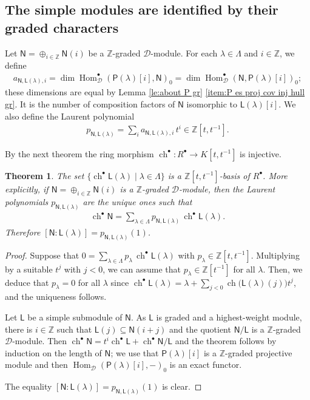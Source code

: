 \documentclass[reqno]{amsart}
\renewcommand{\_}[1]{_{\left( #1 \right)}}
\renewcommand{\^}[1]{^{\left( #1 \right)}}
\newcommand\fL{\mathsf{L}}
\newcommand\fN{\mathsf{N}}
\newcommand\fP{\mathsf{P}}
\newcommand{\Z}{{\mathbb Z}}
\newcommand{\D}{\mathcal{D}}
\newcommand{\ch}{\operatorname{ch}}
\newcommand{\chgr}{\operatorname{ch}^{\bullet}}
\newcommand\Hom{\operatorname{Hom}}
\theoremstyle{plain}
\newtheorem{theorem}[lema]{Theorem}
\theoremstyle{definition}
\theoremstyle{remark}
\begin{document}
\subsection{The simple modules are identified by their graded characters}

Let $\fN=\oplus_{i\in\Z}\fN(i)$ be a $\Z$-graded $\D$-module. For each $\lambda\in\Lambda$ and $i\in\Z$, we define
\begin{align}\label{eq:definition of a fN fLlambda i}
a_{\fN,\fL(\lambda),i}=\dim\Hom^\bullet_{\D}(\fP(\lambda)[i],\fN)_0=\dim\Hom^\bullet_{\D}(\fN,\fP(\lambda)[i])_0;
\end{align}
these dimensions are equal by Lemma \ref{le:about P gr} \ref{item:P es proj cov inj hull gr}. It is the number of composition factors of $\fN$ isomorphic to $\fL(\lambda)[i]$. We also define the Laurent polynomial 
\begin{align}\label{eq:def of p fN fLlambda i}
p_{\fN,\fL(\lambda)}=\sum_{i}a_{\fN,\fL(\lambda),i}\,t^i\in\Z[t,t^{-1}]. 
\end{align}
 
By the next theorem the ring morphism $\chgr:R^{\bullet}\longrightarrow K[t,t^{-1}]$ is injective. 

 
\begin{theorem}\label{teo:chgr}
The set $\{\chgr\fL(\lambda)\mid\lambda\in\Lambda\}$ is a $\Z[t,t^{-1}]$-basis of $R^\bullet$. More explicitly, if $\fN=\oplus_{i\in\Z}\fN(i)$ is a $\Z$-graded $\D$-module, then the Laurent polynomials $p_{\fN,\fL(\lambda)}$ are the unique ones such that
\begin{align*}
\chgr\fN=\sum_{\lambda\in\Lambda}p_{\fN,\fL(\lambda)}\,\chgr\fL(\lambda).
\end{align*}
Therefore $[\fN:\fL(\lambda)]=p_{\fN,\fL(\lambda)}(1)$.
\end{theorem}

\begin{proof}
Suppose that $0=\sum_{\lambda\in\Lambda}p_{\lambda}\,\chgr\fL(\lambda)$ with $p_{\lambda}\in\Z[t,t^{-1}]$. Multiplying by a suitable $t^{j}$ with $j<0$, we can assume that $p_{\lambda}\in\Z[t^{-1}]$ for all $\lambda$. Then, we deduce that $p_{\lambda}=0$ for all $\lambda$ since $\chgr\fL(\lambda)=\lambda+\sum_{j<0}\ch\bigl(\fL(\lambda)(j)\bigr)t^j$, and the uniqueness follows.

Let $\fL$ be a simple submodule of $\fN$. As $\fL$ is graded and a highest-weight module, there is $i\in\Z$ such that $\fL(j)\subseteq\fN(i+j)$ and 
the quotient $\fN/\fL$ is a $\Z$-graded $\D$-module. Then $\chgr\fN=t^i\chgr\fL+\chgr\fN/\fL$ and the theorem follows by induction on the length of $\fN$; we use that $\fP(\lambda)[i]$ is a $\Z$-graded projective module and then $\Hom_{\D}(\fP(\lambda)[i],-)_0$ is an exact functor.

The equality $[\fN:\fL(\lambda)]=p_{\fN,\fL(\lambda)}(1)$ is clear.
\end{proof}
\end{document}

